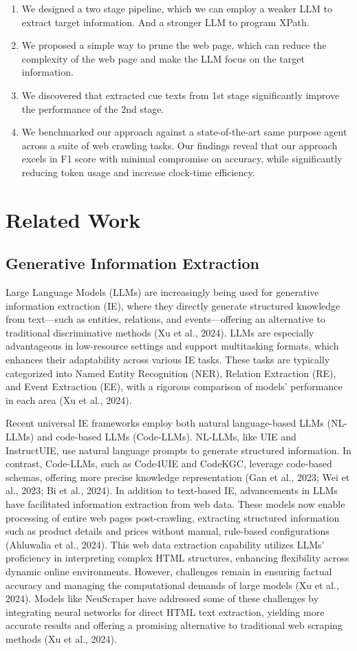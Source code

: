 \documentclass[a4paper]{article}
\begin{document}
\begin{enumerate}
  \item We designed a two stage pipeline, which we can employ a weaker LLM to extract target information. And a stronger LLM to program XPath.
  \item We proposed a simple way to prune the web page, which can reduce the complexity of the web page and make the LLM focus on the target information.
  \item We discovered that extracted cue texts from 1st stage significantly improve the performance of the 2nd stage.
  \item We benchmarked our approach against a state-of-the-art same purpose agent across a suite of web crawling tasks. Our findings reveal that our approach excels in F1 score with minimal compromise on accuracy, while significantly reducing token usage and increase clock-time efficiency.
\end{enumerate}

\section{Related Work}
\subsection{Generative Information Extraction}
Large Language Models (LLMs) are increasingly being used for generative information extraction (IE), where they directly generate structured knowledge from text—such as entities, relations, and events—offering an alternative to traditional discriminative methods (Xu et al., 2024). LLMs are especially advantageous in low-resource settings and support multitasking formats, which enhances their adaptability across various IE tasks. These tasks are typically categorized into Named Entity Recognition (NER), Relation Extraction (RE), and Event Extraction (EE), with a rigorous comparison of models’ performance in each area (Xu et al., 2024).

Recent universal IE frameworks employ both natural language-based LLMs (NL-LLMs) and code-based LLMs (Code-LLMs). NL-LLMs, like UIE and InstructUIE, use natural language prompts to generate structured information. In contrast, Code-LLMs, such as Code4UIE and CodeKGC, leverage code-based schemas, offering more precise knowledge representation (Gan et al., 2023; Wei et al., 2023; Bi et al., 2024). In addition to text-based IE, advancements in LLMs have facilitated information extraction from web data. These models now enable processing of entire web pages post-crawling, extracting structured information such as product details and prices without manual, rule-based configurations (Ahluwalia et al., 2024). This web data extraction capability utilizes LLMs’ proficiency in interpreting complex HTML structures, enhancing flexibility across dynamic online environments. However, challenges remain in ensuring factual accuracy and managing the computational demands of large models (Xu et al., 2024). Models like NeuScraper have addressed some of these challenges by integrating neural networks for direct HTML text extraction, yielding more accurate results and offering a promising alternative to traditional web scraping methods (Xu et al., 2024).
\end{document}
